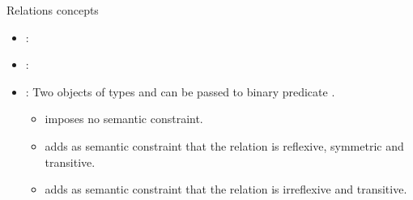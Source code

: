 \begin{frame}[t,fragile]{Relations concepts}
\begin{itemize}
  \item {}:
  \item {}:
  \item {}:
  Two objects of types  and  can be passed to binary predicate .

    \begin{itemize}
      \item {} imposes no semantic constraint.

      \item {} adds as semantic constraint that the
            relation is reflexive, symmetric and transitive.

      \item {} adds as semantic constraint that the
            relation is irreflexive and transitive.
    \end{itemize}

\end{itemize}
\end{frame}
